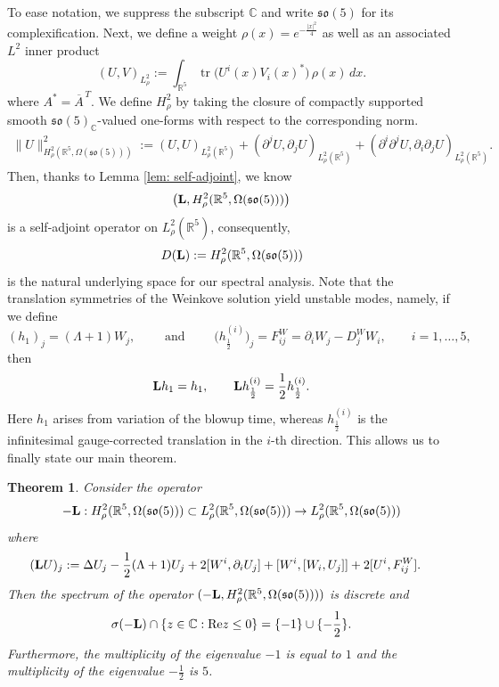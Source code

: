 \documentclass[11pt,reqno]{amsart}
\newtheorem{theorem}{Theorem}[section]
\theoremstyle{remark}
\newcommand{\R}{\mathbb{R}}
\newcommand{\Lf}{\textup{\textbf{L}}}
\renewcommand{\Re}{\textup{Re}}
\newcommand{\C}{\mathbb{C}}
\theoremstyle{definition}
\begin{document}
To ease notation, we suppress the subscript \(\mathbb C\) and write \(\mathfrak{so}(5)\) for its complexification.
Next, we define a weight $\rho(x)=e^{-\frac{|x|^2}{4}}$ as well as an associated $L^2$ inner product
\[
(U,V)_{L^2_\rho}
:=\int_{\mathbb R^5}\operatorname{tr}\!\bigl(U^i(x)V_i(x)^*\bigr)\,\rho(x)\,dx.
\]
where \(A^*=\overline A^{\,T}\). We define \(H^2_\rho\) by taking the closure of compactly supported smooth \(\mathfrak{so}(5)_{\mathbb C}\)-valued one-forms with respect to the corresponding norm.
\begin{align*}
  \|U\|_{H^2_\rho(\R^5,\Omega(\mathfrak{so}(5)))}^2:=  (U,U)_{L^2_\rho(\R^5)}+(\partial^jU,\partial_j U)_{L^2_\rho(\R^5)}+(\partial^i \partial^jU,\partial_i \partial_jU)_{L^2_\rho(\R^5)}.
\end{align*}
Then, thanks to Lemma \ref{lem: self-adjoint}, we know
$$
\left(\Lf, H^2_\rho(\R^5,\Omega(\mathfrak{so}(5)))\right)
$$
is a self-adjoint operator on $L^2_\rho(\R^5)$, consequently, 
$$
D(\Lf):= H^2_\rho(\R^5,\Omega(\mathfrak{so}(5)))
$$
is the natural underlying space for our spectral analysis. 
Note that the translation symmetries of the Weinkove solution yield unstable modes, 
namely, if we define 
\[
(h_{1})_j=(\Lambda+1)W_j,
\qquad \text{ and } \qquad 
\big(h_{\frac{1}{2}}^{(i)}\big)_j=F_{ij}^W
=\partial_iW_j-D_j^W W_i,
\qquad i=1,\dots,5,
\]
then
\[
\Lf h_1=h_1,
\qquad
\Lf h_{\frac12}^{(i)}=\frac12 h_{\frac12}^{(i)}.
\]
Here $h_1$ arises from variation of the blowup time, whereas $h_{\frac12}^{(i)}$
is the infinitesimal gauge-corrected translation in the $i$-th direction.
This allows us to finally state our main theorem.

\begin{theorem}
\label{thm:main}
Consider the operator \[-\Lf: H^2_\rho(\R^5,\Omega(\mathfrak{so}(5)))\subset L^2_\rho(\R^5,\Omega(\mathfrak{so}(5)))\to L^2_\rho(\R^5,\Omega(\mathfrak{so}(5)))\]
where
\begin{align*}
      (\Lf U)_j &:=  \Delta U_j -\frac12(\Lambda+1) U_j+2[W^i, \partial_iU_j]+[W^i,[W_i,U_j]]+2[U^i,F_{ij}^W].
\end{align*}
Then the spectrum of the operator $(-\Lf, H^2_\rho(\R^5,\Omega(\mathfrak{so}(5))))$ is discrete and
    $$
\sigma (-\Lf)\cap \{z\in \C: \Re z \leq 0 \}=\{-1\}\cup \{-\frac12\}. 
    $$
Furthermore, the multiplicity of the eigenvalue $-1$ is equal to $1$ and the multiplicity of the eigenvalue $-\frac{1}{2}$ is $5$. 
\end{theorem}
\end{document}
